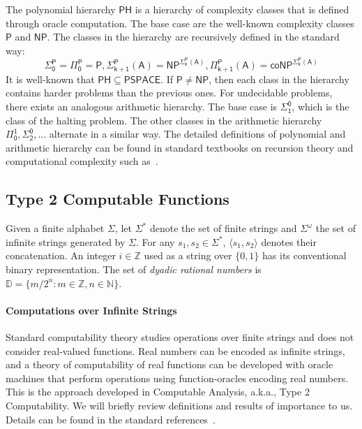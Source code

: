 \documentclass[12pt]{article}
\theoremstyle{plain}
\theoremstyle{definition}
\newcommand{\np}{\mathsf{NP}}
\begin{document}
The polynomial hierarchy $\mathsf{PH}$ is a hierarchy of complexity classes that is defined through oracle computation. The base case are the well-known complexity classes $\mathsf{P}$ and $\np$. The classes in the hierarchy are recursively defined in the standard way:
$$
\mathsf{\Sigma_0^P} = \mathsf{\Pi_0^P} = \mathsf{P}, \mathsf{\Sigma_{k+1}^P(A)} =\mathsf{NP^{\Sigma_k^P(A)}}, \mathsf{\Pi_{k+1}^P(A)}= \mathsf{coNP^{\Sigma_{k}^P(A)}}
$$
It is well-known that $\mathsf{PH}\subseteq \mathsf{PSPACE}$. If $\mathsf{P}\neq \mathsf{NP}$, then each class in the hierarchy contains harder problems than the previous ones. For undecidable problems, there exists an analogous arithmetic hierarchy. The base case is $\mathsf{\Sigma_1^0}$, which is the class of the halting problem. The other classes in the arithmetic hierarchy $\mathsf{\Pi_0^1}, \mathsf{\Sigma_2^0}, ...$ alternate in a similar way. The detailed definitions of polynomial and arithmetic hierarchy can be found in standard textbooks on recursion theory and computational complexity such as~\cite{arora09}.

\subsection{Type 2 Computable Functions}

Given a finite alphabet $\Sigma$, let $\Sigma^*$ denote the set of finite strings and $\Sigma^{\omega}$ the set of infinite strings generated by $\Sigma$. For any $s_1, s_2\in \Sigma^*$, $\langle s_1,s_2\rangle$ denotes their concatenation. An integer $i\in \mathbb{Z}$ used as a string over $\{0,1\}$ has its conventional binary representation. The set of {\em dyadic rational numbers} is $\mathbb{D} = \{m/2^n: m\in \mathbb{Z}, n\in \mathbb{N}\}$.

\paragraph{Computations over Infinite Strings} Standard computability theory studies operations over finite strings and does not consider real-valued functions. Real numbers can be encoded as infinite strings, and a theory of computability of real functions can be developed with oracle machines that perform operations using function-oracles encoding real numbers. This is the approach developed in Computable Analysis, a.k.a., Type 2 Computability. We will briefly review definitions and results of importance to us. Details can be found in the standard references~\cite{CAbook,Kobook,vasco}.
\end{document}
